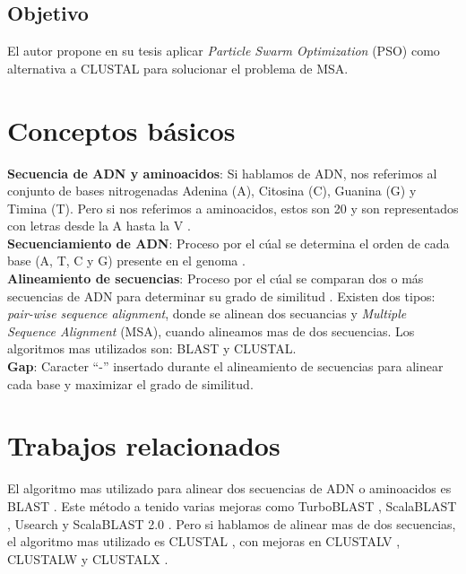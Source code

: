 \documentclass[conference]{IEEEtran}
\begin{document}
\subsection{Objetivo}

El autor propone en su tesis aplicar \textit{Particle Swarm Optimization} (PSO) como alternativa a CLUSTAL para solucionar el problema de MSA.\\


\section{Conceptos básicos}

\textbf{Secuencia de ADN y aminoacidos}: Si hablamos de ADN, nos referimos al conjunto de bases nitrogenadas Adenina (A), Citosina (C), Guanina (G) y Timina (T). Pero si nos referimos a aminoacidos, estos son 20 y son representados con letras desde la A hasta la V \cite{xiong2006essential}. \\

\textbf{Secuenciamiento de ADN}: Proceso por el cúal se determina el orden de cada base (A, T, C y G) presente en el genoma \cite{archibald2018genomics}.\\

\textbf{Alineamiento de secuencias}: Proceso por el cúal se comparan dos o más secuencias de ADN para determinar su grado de similitud \cite{xiong2006essential}. Existen dos tipos: \textit{pair-wise sequence alignment}, donde se alinean dos secuancias y \textit{Multiple Sequence Alignment} (MSA), cuando alineamos mas de dos secuencias. Los algoritmos mas utilizados son: BLAST y CLUSTAL.\\ 

\textbf{Gap}: Caracter ``-'' insertado durante el alineamiento de secuencias para alinear cada base y maximizar el grado de similitud.\\



\section{Trabajos relacionados}


El algoritmo mas utilizado para alinear dos secuencias de ADN o aminoacidos es BLAST \cite{altschul1997gapped}. Este método a tenido varias mejoras como TurboBLAST \cite{bjornson2002turboblast},  ScalaBLAST \cite{oehmen2006scalablast}, Usearch \cite{edgar2010search} y  ScalaBLAST 2.0 \cite{oehmen2013scalablast}. Pero si hablamos de alinear mas de dos secuencias, el algoritmo mas utilizado es  CLUSTAL \cite{higgins1988clustal}, con mejoras en CLUSTALV \cite{higgins1992clustal}, CLUSTALW \cite{thompson1994clustal} y CLUSTALX \cite{jeanmougin1998multiple}.  \\
\end{document}
